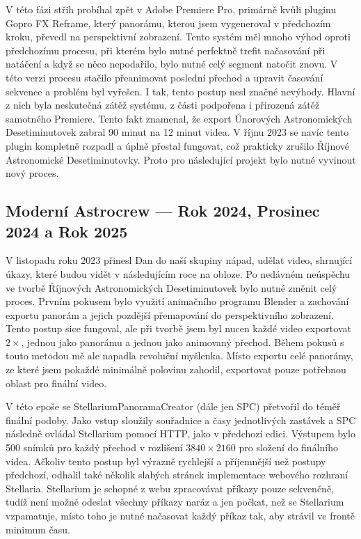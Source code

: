 \documentclass[12pt,a4paper,titlepage]{article}
\begin{document}
V této fázi střih probíhal zpět v Adobe Premiere Pro, primárně kvůli pluginu Gopro FX Reframe, který panorámu, kterou jsem vygeneroval v předchozím kroku, převedl na perspektivní zobrazení. Tento systém měl mnoho výhod oproti předchozímu procesu, při kterém bylo nutné perfektně trefit načasování při natáčení a když se něco nepodařilo, bylo nutné celý segment natočit znovu. V této verzi procesu stačilo přeanimovat poslední přechod a upravit časování sekvence a problém byl vyřešen. I tak, tento postup nesl značné nevýhody. Hlavní z nich byla neskutečná zátěž systému, z části podpořena i přirozená zátěž samotného Premiere. Tento fakt znamenal, že export Únorových Astronomických Desetiminutovek zabral 90 minut na 12 minut videa. V říjnu 2023 se navíc tento plugin kompletně rozpadl a úplně přestal fungovat, což prakticky zrušilo Říjnové Astronomické Desetiminutovky. Proto pro následující projekt bylo nutné vyvinout nový proces. 
\subsection{Moderní Astrocrew --- Rok 2024, Prosinec 2024 a Rok 2025}
V listopadu roku 2023 přinesl Dan do naší skupiny nápad, udělat video, shrnující úkazy, které budou vidět v následujícím roce na obloze. Po nedávném neúspěchu ve tvorbě Říjnových Astronomických Desetiminutovek bylo nutné změnit celý proces. Prvním pokusem bylo využití animačního programu Blender a zachování exportu panorám a jejich pozdější přemapování do perspektivního zobrazení. Tento postup sice fungoval, ale při tvorbě jsem byl nucen každé video exportovat \(2\times \), jednou jako panorámu a jednou jako animovaný přechod. Během pokusů s touto metodou mě ale napadla revoluční myšlenka. Místo exportu celé panorámy, ze které jsem pokaždé minimálně polovinu zahodil, exportovat pouze potřebnou oblast pro finální video. 

V této epoše se StellariumPanoramaCreator (dále jen SPC) přetvořil do téměř finální podoby. Jako vstup sloužily souřadnice a časy jednotlivých zastávek a SPC následně ovládal Stellarium pomocí HTTP, jako v předchozí edici. Výstupem bylo 500 snímků pro každý přechod v rozlišení \(3840\times2160\) pro složení do finálního videa. Ačkoliv tento postup byl výrazně rychlejší a příjemnější než postupy předchozí, odhalil také několik slabých stránek implementace webového rozhraní Stellaria. Stellarium je schopné z webu zpracovávat příkazy pouze sekvenčně, tudíž není možné odeslat všechny příkazy naráz a jen počkat, než se Stellarium vzpamatuje, místo toho je nutné načasovat každý příkaz tak, aby strávil ve frontě minimum času.
\end{document}
